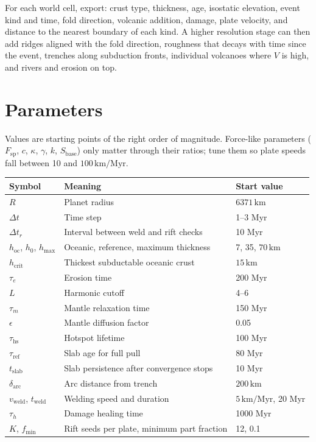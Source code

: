 \documentclass[11pt,a4paper]{article}
\newcommand{\km}{\,\mathrm{km}}
\begin{document}
For each world cell, export: crust type, thickness, age, isostatic elevation,
event kind and time, fold direction, volcanic addition, damage, plate
velocity, and distance to the nearest boundary of each kind. A higher
resolution stage can then add ridges aligned with the fold direction,
roughness that decays with time since the event, trenches along subduction
fronts, individual volcanoes where $V$ is high, and rivers and erosion on top.

\section{Parameters}

Values are starting points of the right order of magnitude. Force-like
parameters ($F_\mathrm{sp}$, $c$, $\kappa$, $\gamma$, $k$, $S_\mathrm{base}$)
only matter through their ratios; tune them so plate speeds fall between 10
and $100\km/\mathrm{Myr}$.

\begin{table}[h]
\centering
\begin{tabular}{@{}lll@{}}
\toprule
Symbol & Meaning & Start value \\
\midrule
$R$ & Planet radius & $6371\km$ \\
$\Delta t$ & Time step & 1--3 Myr \\
$\Delta t_r$ & Interval between weld and rift checks & 10 Myr \\
$h_\mathrm{oc}$, $h_0$, $h_\mathrm{max}$ & Oceanic, reference, maximum thickness & 7, 35, $70\km$ \\
$h_\mathrm{crit}$ & Thickest subductable oceanic crust & $15\km$ \\
$\tau_e$ & Erosion time & 200 Myr \\
$L$ & Harmonic cutoff & 4--6 \\
$\tau_m$ & Mantle relaxation time & 150 Myr \\
$\epsilon$ & Mantle diffusion factor & 0.05 \\
$\tau_\mathrm{hs}$ & Hotspot lifetime & 100 Myr \\
$\tau_\mathrm{ref}$ & Slab age for full pull & 80 Myr \\
$t_\mathrm{slab}$ & Slab persistence after convergence stops & 10 Myr \\
$\delta_\mathrm{arc}$ & Arc distance from trench & $200\km$ \\
$v_\mathrm{weld}$, $t_\mathrm{weld}$ & Welding speed and duration & $5\km/\mathrm{Myr}$, 20 Myr \\
$\tau_h$ & Damage healing time & 1000 Myr \\
$K$, $f_\mathrm{min}$ & Rift seeds per plate, minimum part fraction & 12, 0.1 \\
\bottomrule
\end{tabular}
\end{table}
\end{document}
